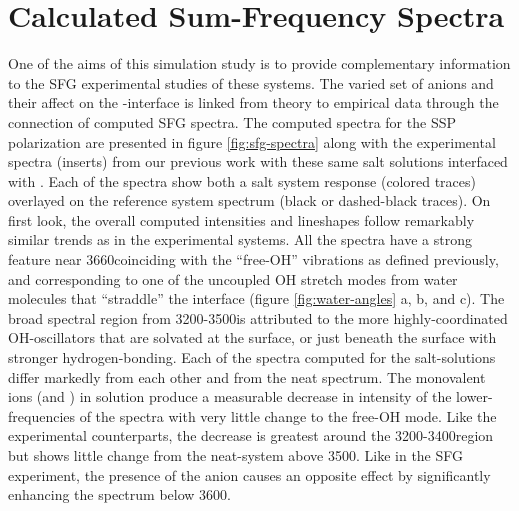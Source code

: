 \section{Calculated Sum-Frequency Spectra}

One of the aims of this simulation study is to provide complementary information to the SFG experimental studies of these systems.\cite{McFearin2009} The varied set of anions and their affect on the \ctc-\wat interface is linked from theory to empirical data through the connection of computed SFG spectra. The computed spectra for the SSP polarization are presented in figure \ref{fig:sfg-spectra} along with the experimental spectra (inserts) from our previous work with these same salt solutions interfaced with \ctc.\cite{McFearin2009} Each of the spectra show both a salt system response (colored traces) overlayed on the reference \ctcwat system spectrum (black or dashed-black traces). On first look, the overall computed intensities and lineshapes follow remarkably similar trends as in the experimental systems. All the spectra have a strong feature near 3660\cm coinciding with the ``free-OH'' vibrations as defined previously, and corresponding to one of the uncoupled OH stretch modes from water molecules that ``straddle'' the interface (figure \ref{fig:water-angles} a, b, and c).\cite{McFearin2009} The broad spectral region from 3200-3500\cm is attributed to the more highly-coordinated OH-oscillators that are solvated at the surface, or just beneath the surface with stronger hydrogen-bonding. Each of the spectra computed for the salt-solutions differ markedly from each other and from the neat \ctcwat spectrum. The monovalent ions (\cl and \nit) in solution produce a measurable decrease in intensity of the lower-frequencies of the spectra with very little change to the free-OH mode. Like the experimental counterparts, the decrease is greatest around the 3200-3400\cm region but shows little change from the neat-\ctcwat system above 3500\cm. Like in the SFG experiment, the presence of the \sul anion causes an opposite effect by significantly enhancing the spectrum below 3600\cm.

